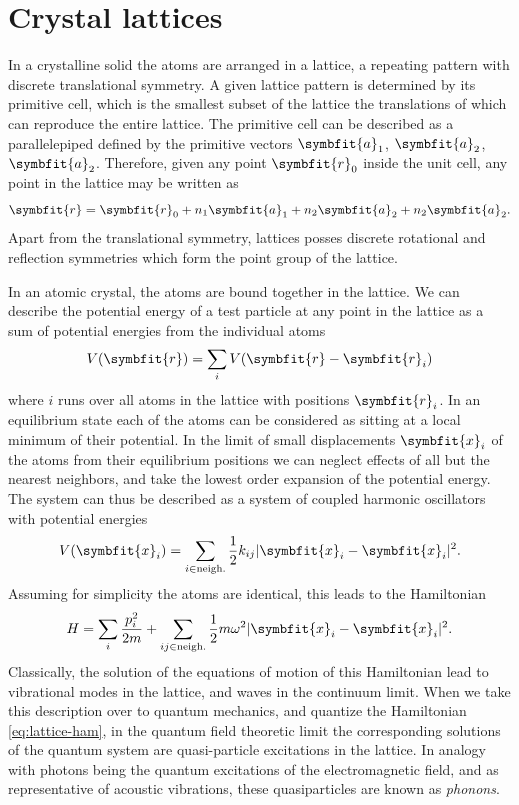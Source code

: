 \documentclass[b5paper, 10pt, twoside]{book}
\renewcommand{\vec}[1]{\symbfit{#1}}
\begin{document}
\section{Crystal lattices}

In a crystalline solid the atoms are arranged in a lattice, a repeating pattern with discrete translational symmetry. A given lattice pattern is determined by its primitive cell, which is the smallest subset of the lattice the translations of which can reproduce the entire lattice. The primitive cell can be described as a parallelepiped defined by the primitive vectors $\vec{a}_1$, $\vec{a}_2$, $\vec{a}_2$. Therefore, given any point $\vec{r}_0$ inside the unit cell, any point in the lattice may be written as
\begin{equation}
\vec{r}=\vec{r}_0+n_1\vec{a}_1+n_2\vec{a}_2+n_2\vec{a}_2.
\end{equation}
Apart from the translational symmetry, lattices posses discrete rotational and reflection symmetries which form the point group of the lattice.

In an atomic crystal, the atoms are bound together in the lattice. We can describe the potential energy of a test particle at any point in the lattice as a sum of potential energies from the individual atoms
\begin{equation}
V(\vec{r})=\sum_iV(\vec{r}-\vec{r}_i)
\label{eq:crystal-atom-pe}
\end{equation}
where $i$ runs over all atoms in the lattice with positions $\vec{r}_i$. In an equilibrium state each of the atoms can be considered as sitting at a local minimum of their potential. In the limit of small displacements $\vec{x}_i$ of the atoms from their equilibrium positions we can neglect effects of all but the nearest neighbors, and take the lowest order expansion of the potential energy. The system can thus be described as a system of coupled harmonic oscillators with potential energies
\begin{equation}
V(\vec{x}_i)=\sum_{i\in\text{neigh.}}\frac{1}{2}k_{ij}|\vec{x}_i-\vec{x}_i|^2.
\end{equation}
Assuming for simplicity the atoms are identical, this leads to the Hamiltonian
\begin{equation}
H=\sum_i\frac{p_i^2}{2m}+\sum_{ij\in\text{neigh.}}\frac{1}{2}m\omega^2|\vec{x}_i-\vec{x}_i|^2.
\label{eq:lattice-ham}
\end{equation}
Classically, the solution of the equations of motion of this Hamiltonian lead to vibrational modes in the lattice, and waves in the continuum limit. When we take this description over to quantum mechanics, and quantize the Hamiltonian \eqref{eq:lattice-ham}, in the quantum field theoretic limit the corresponding solutions of the quantum system are quasi-particle excitations in the lattice. In analogy with photons being the quantum excitations of the electromagnetic field, and as representative of acoustic vibrations, these quasiparticles are known as \emph{phonons}.
\end{document}
